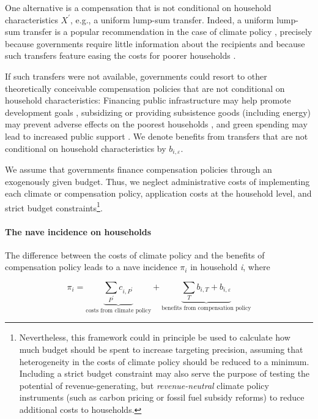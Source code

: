 \documentclass[12pt, a4paper]{article}
\begin{document}
One alternative is a compensation that is not conditional on household characteristics $X^{\prime}$, e.g., a uniform lump-sum transfer. Indeed, a uniform lump-sum transfer is a popular recommendation in the case of climate policy \autocite{Stiglitz.2017,Baranzini.2000,Metcalf.2009,Sager.2023}, precisely because governments require little information about the recipients and because such transfers feature easing the costs for poorer households \autocite{Budolfson.2021,vanderPloeg.2022}. 

If such transfers were not available, governments could resort to other theoretically conceivable compensation policies that are not conditional on household characteristics: Financing public infrastructure may help promote development goals \autocite{Franks.2018,Jakob.2016}, subsidizing or providing subsistence goods (including energy) may prevent adverse effects on the poorest households \autocite{Greve.2022,Schaffitzel.2019}, and green spending may lead to increased public support \autocite{Sommer.2022,Kotchen.2017,Dechezlepretre.2022}. We denote benefits from transfers that are not conditional on household characteristics by $b_{i,\varepsilon}$.

We assume that governments finance compensation policies through an exogenously given budget. Thus, we neglect administrative costs of implementing each climate or compensation policy, application costs at the household level, and strict budget constraints\footnote{Nevertheless, this framework could in principle be used to calculate how much budget should be spent to increase targeting precision, assuming that heterogeneity in the costs of climate policy should be reduced to a minimum. Including a strict budget constraint may also serve the purpose of testing the potential of revenue-generating, but \textit{revenue-neutral} climate policy instruments (such as carbon pricing or fossil fuel subsidy reforms) to reduce additional costs to households.}. 

\paragraph{The nave incidence on households}
The difference between the costs of climate policy and the benefits of compensation policy leads to a nave incidence $\pi_{i}$ in household \textit{i}, where

\begin{equation} \label{eq:pi}
    \pi_{i} = \underbrace{\sum_{P^{\prime}} c_{i,P^{\prime}}}_{\text{costs from climate policy}} + \underbrace{\sum_{T} b_{i,T} + b_{i,\varepsilon}}_{\text{benefits from compensation policy}}
\end{equation}
\end{document}
